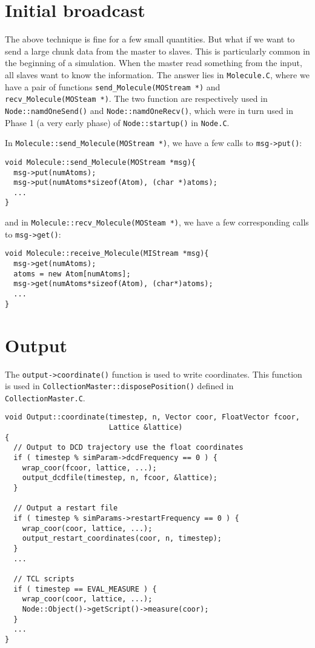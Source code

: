 \documentclass{article}
\begin{document}
\section{\label{sec:initbroadcast}Initial broadcast}

The above technique is fine for a few small quantities.
%
But what if we want to send a large chunk data from the master to slaves.
%
This is particularly common in the beginning of a simulation.
%
When the master read something from the input,
all slaves want to know the information.
%
The answer lies in \texttt{Molecule.C}, where we have
a pair of functions
\texttt{send\_Molecule(MOStream *)}
and
\texttt{recv\_Molecule(MOSteam *)}.
%
The two function are respectively used in \texttt{Node::namdOneSend()}
and \texttt{Node::namdOneRecv()},
which were in turn used in Phase 1 (a very early phase) of \texttt{Node::startup()}
in \texttt{Node.C}.

In \texttt{Molecule::send\_Molecule(MOStream *)},
we have a few calls to \texttt{msg->put()}:
\begin{lstlisting}
void Molecule::send_Molecule(MOStream *msg){
  msg->put(numAtoms);
  msg->put(numAtoms*sizeof(Atom), (char *)atoms);
  ...
}
\end{lstlisting}
and in \texttt{Molecule::recv\_Molecule(MOSteam *)},
we have a few corresponding calls to \texttt{msg->get()}:
%
\begin{lstlisting}
void Molecule::receive_Molecule(MIStream *msg){
  msg->get(numAtoms);
  atoms = new Atom[numAtoms];
  msg->get(numAtoms*sizeof(Atom), (char*)atoms);
  ...
}
\end{lstlisting}



\section{Output}

The \texttt{output->coordinate()} function is used to write coordinates.
%
This function is used in \texttt{CollectionMaster::disposePosition()}
defined in \texttt{CollectionMaster.C}.

\begin{lstlisting}
void Output::coordinate(timestep, n, Vector coor, FloatVector fcoor,
                        Lattice &lattice)
{
  // Output to DCD trajectory use the float coordinates
  if ( timestep % simParam->dcdFrequency == 0 ) {
    wrap_coor(fcoor, lattice, ...);
    output_dcdfile(timestep, n, fcoor, &lattice);
  }

  // Output a restart file
  if ( timestep % simParams->restartFrequency == 0 ) {
    wrap_coor(coor, lattice, ...);
    output_restart_coordinates(coor, n, timestep);
  }
  ...

  // TCL scripts
  if ( timestep == EVAL_MEASURE ) {
    wrap_coor(coor, lattice, ...);
    Node::Object()->getScript()->measure(coor);
  }
  ...
}
\end{lstlisting}
\end{document}

